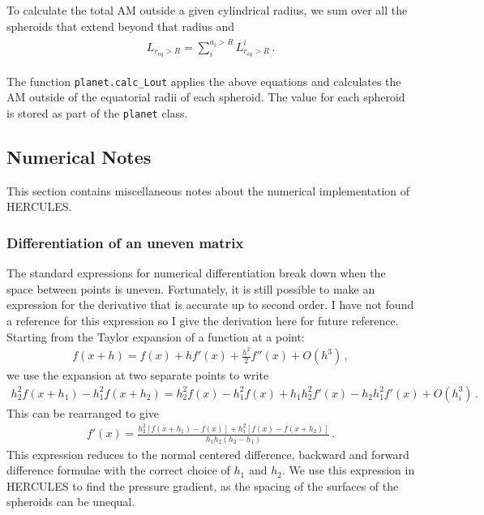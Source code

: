 \documentclass[11pt, oneside]{article}   	%
\begin{document}
To calculate the total AM outside a given cylindrical radius, we sum over all the spheroids that extend beyond that radius and
%
\begin{align}
\begin{aligned}
L_{r_{eq}>R} = \sum_{i}^{a_i>R} L_{r_{eq}>R}^i \,.
\end{aligned}
\end{align}
%

The function \texttt{planet.calc\_Lout} applies the above equations and calculates the AM outside of the equatorial radii of each spheroid.
The value for each spheroid is stored as part of the \texttt{planet} class.

\subsection{Numerical Notes}
This section contains miscellaneous notes about the numerical implementation of HERCULES. 

\subsubsection{Differentiation of an uneven matrix}
The standard expressions for numerical differentiation break down when the space between points is uneven.
Fortunately, it is still possible to make an expression for the derivative that is accurate up to second order.
I have not found a reference for this expression so I give the derivation here for future reference.
Starting from the Taylor expansion of a function at a point:
%
\begin{align}
f(x+h)=f(x)+hf'(x)+\frac{h^2}{2}f''(x) + O(h^3) \,,
\end{align}
%
we use the expansion at two separate points to write
%
\begin{align}
h_2^2 f(x+h_1)-h_1^2 f(x+h_2)=h_2^2 f(x)- h_1^2 f(x) + h_1 h_2^2 f'(x) - h_2 h_1^2 f'(x)  + O(h_i^3) \,.
\end{align}
%
This can be rearranged to give
%
\begin{align}
f'(x)=\frac{ h_2^2 [ f(x+h_1)-f(x) ] + h_1^2 [f(x) - f(x+h_2) ]}{h_1 h_2 (h_2-h_1)} \,.
\end{align}
%
This expression reduces to the normal centered difference, backward and forward difference formulae with the correct choice of $h_1$ and $h_2$. 
We use this expression in HERCULES to find the pressure gradient, as the spacing of the surfaces of the spheroids can be unequal.
\end{document}
